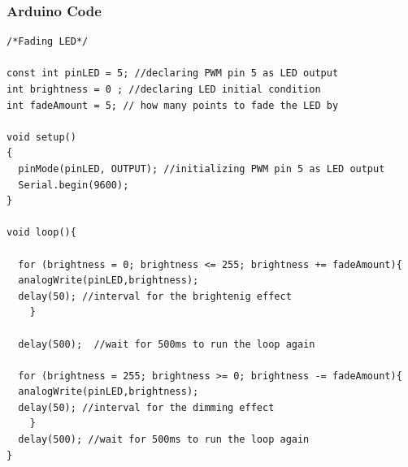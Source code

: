 \pagebreak\subsubsection{Arduino Code}
    \begin{lstlisting}[style = Arduino]
/*Fading LED*/

const int pinLED = 5; //declaring PWM pin 5 as LED output
int brightness = 0 ; //declaring LED initial condition
int fadeAmount = 5; // how many points to fade the LED by

void setup()
{
  pinMode(pinLED, OUTPUT); //initializing PWM pin 5 as LED output
  Serial.begin(9600);
}

void loop(){

  for (brightness = 0; brightness <= 255; brightness += fadeAmount){
  analogWrite(pinLED,brightness);
  delay(50); //interval for the brightenig effect
	}
	
  delay(500);  //wait for 500ms to run the loop again
  
  for (brightness = 255; brightness >= 0; brightness -= fadeAmount){
  analogWrite(pinLED,brightness);
  delay(50); //interval for the dimming effect
	}
  delay(500); //wait for 500ms to run the loop again
}\end{lstlisting}